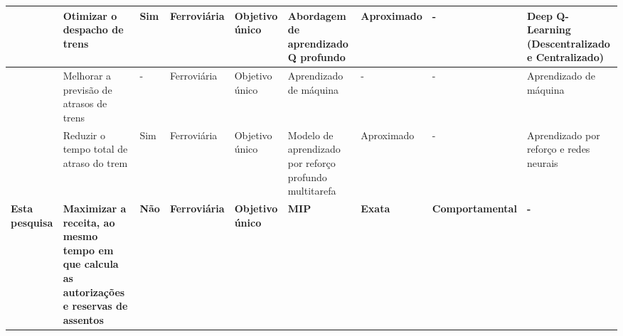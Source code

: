 \begin{center}
\begin{longtable}{|M{2cm}|M{3.7cm}|M{0.5cm}|M{1.1cm}|M{1cm}|M{2cm}|M{1.7cm}|M{1.7cm}|M{1.5cm}|}
		\citep{AGASUCCI2023}      &  Otimizar o despacho de trens                                                                                                                         & Sim                 & Ferroviária          &  Objetivo único          &  Abordagem de aprendizado Q profundo                     & Aproximado                                      & -                        &  Deep Q-Learning (Descentralizado e Centralizado)          \\ \hline
		\citep{SARHANI2024100120} &  Melhorar a previsão de atrasos de trens                                                                                                              & -                   & Ferroviária          &  Objetivo único          &  Aprendizado de máquina                                  & -                                               & -                        &  Aprendizado de máquina                                    \\ \hline
		\citep{TANG2025103900}    &  Reduzir o tempo total de atraso do trem                                                                                                              & Sim                 & Ferroviária          &  Objetivo único          &  Modelo de aprendizado por reforço profundo multitarefa  & Aproximado                                      & -                        &  Aprendizado por reforço e redes neurais                   \\ \hline
		\textbf{Esta pesquisa}    &  \textbf{Maximizar a receita, ao mesmo tempo em que calcula as autorizações e reservas de assentos}                                                   & \textbf{Não}        & \textbf{Ferroviária} &  \textbf{Objetivo único} &  \textbf{MIP}                                            & \textbf{Exata}                                  & \textbf{Comportamental}  & \textbf{-}                                                \\ \hline
	\end{longtable}
\end{center}


